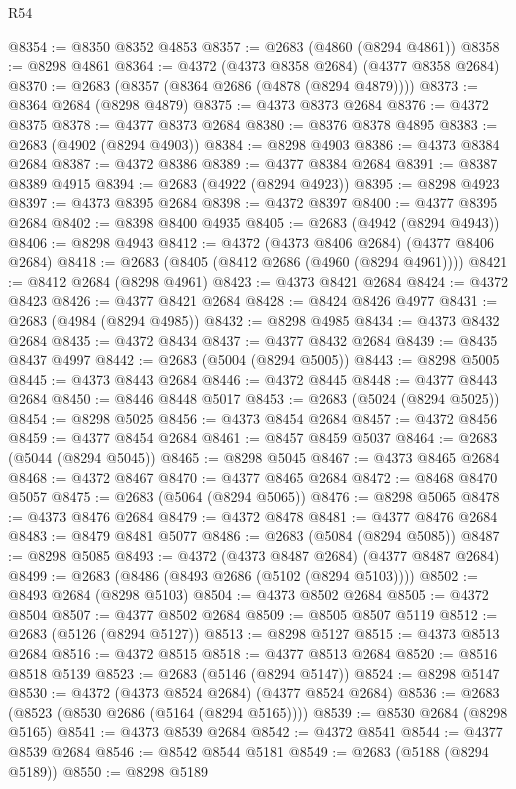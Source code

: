 \begin{lexlean}{R54}
\begin{coremodule}
@8354 := @8350 @8352 @4853
@8357 := @2683 (@4860 (@8294 @4861))
@8358 := @8298 @4861
@8364 := @4372 (@4373 @8358 @2684) (@4377 @8358 @2684)
@8370 := @2683 (@8357 (@8364 @2686 (@4878 (@8294 @4879))))
@8373 := @8364 @2684 (@8298 @4879)
@8375 := @4373 @8373 @2684
@8376 := @4372 @8375
@8378 := @4377 @8373 @2684
@8380 := @8376 @8378 @4895
@8383 := @2683 (@4902 (@8294 @4903))
@8384 := @8298 @4903
@8386 := @4373 @8384 @2684
@8387 := @4372 @8386
@8389 := @4377 @8384 @2684
@8391 := @8387 @8389 @4915
@8394 := @2683 (@4922 (@8294 @4923))
@8395 := @8298 @4923
@8397 := @4373 @8395 @2684
@8398 := @4372 @8397
@8400 := @4377 @8395 @2684
@8402 := @8398 @8400 @4935
@8405 := @2683 (@4942 (@8294 @4943))
@8406 := @8298 @4943
@8412 := @4372 (@4373 @8406 @2684) (@4377 @8406 @2684)
@8418 := @2683 (@8405 (@8412 @2686 (@4960 (@8294 @4961))))
@8421 := @8412 @2684 (@8298 @4961)
@8423 := @4373 @8421 @2684
@8424 := @4372 @8423
@8426 := @4377 @8421 @2684
@8428 := @8424 @8426 @4977
@8431 := @2683 (@4984 (@8294 @4985))
@8432 := @8298 @4985
@8434 := @4373 @8432 @2684
@8435 := @4372 @8434
@8437 := @4377 @8432 @2684
@8439 := @8435 @8437 @4997
@8442 := @2683 (@5004 (@8294 @5005))
@8443 := @8298 @5005
@8445 := @4373 @8443 @2684
@8446 := @4372 @8445
@8448 := @4377 @8443 @2684
@8450 := @8446 @8448 @5017
@8453 := @2683 (@5024 (@8294 @5025))
@8454 := @8298 @5025
@8456 := @4373 @8454 @2684
@8457 := @4372 @8456
@8459 := @4377 @8454 @2684
@8461 := @8457 @8459 @5037
@8464 := @2683 (@5044 (@8294 @5045))
@8465 := @8298 @5045
@8467 := @4373 @8465 @2684
@8468 := @4372 @8467
@8470 := @4377 @8465 @2684
@8472 := @8468 @8470 @5057
@8475 := @2683 (@5064 (@8294 @5065))
@8476 := @8298 @5065
@8478 := @4373 @8476 @2684
@8479 := @4372 @8478
@8481 := @4377 @8476 @2684
@8483 := @8479 @8481 @5077
@8486 := @2683 (@5084 (@8294 @5085))
@8487 := @8298 @5085
@8493 := @4372 (@4373 @8487 @2684) (@4377 @8487 @2684)
@8499 := @2683 (@8486 (@8493 @2686 (@5102 (@8294 @5103))))
@8502 := @8493 @2684 (@8298 @5103)
@8504 := @4373 @8502 @2684
@8505 := @4372 @8504
@8507 := @4377 @8502 @2684
@8509 := @8505 @8507 @5119
@8512 := @2683 (@5126 (@8294 @5127))
@8513 := @8298 @5127
@8515 := @4373 @8513 @2684
@8516 := @4372 @8515
@8518 := @4377 @8513 @2684
@8520 := @8516 @8518 @5139
@8523 := @2683 (@5146 (@8294 @5147))
@8524 := @8298 @5147
@8530 := @4372 (@4373 @8524 @2684) (@4377 @8524 @2684)
@8536 := @2683 (@8523 (@8530 @2686 (@5164 (@8294 @5165))))
@8539 := @8530 @2684 (@8298 @5165)
@8541 := @4373 @8539 @2684
@8542 := @4372 @8541
@8544 := @4377 @8539 @2684
@8546 := @8542 @8544 @5181
@8549 := @2683 (@5188 (@8294 @5189))
@8550 := @8298 @5189

\end{coremodule}
\end{lexlean}
